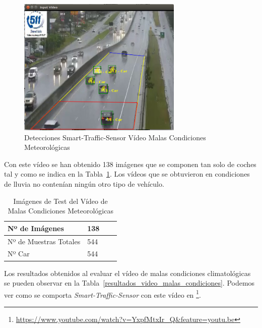 \begin{figure}[H] 
\begin{center}
	\includegraphics[width=0.7\textwidth]{figures/Experimentos/sts_malas_condiciones.png}
   \caption{Detecciones Smart-Traffic-Sensor Vídeo Malas Condiciones Meteorológicas}
	\label{fig.video_malas_condiciones}
\end{center}
\end{figure}

Con este vídeo se han obtenido 138 imágenes que se componen tan solo de coches tal y como se indica en la Tabla~\ref{tabla_video_malas_condiciones}. Los vídeos que se obtuvieron en condiciones de lluvia no contenían ningún otro tipo de vehículo.

\begin{table}[H] 
\begin{center}
\begin{tabular}{|l|l|l|l|}
\hline
Nº de Imágenes  & 138 \\
\hline \hline
Nº de Muestras Totales & 544\\ \hline
Nº Car & 544 \\ \hline
\end{tabular}
\caption{Imágenes de Test del Vídeo de Malas Condiciones Meteorológicas}
\label{tabla_video_malas_condiciones}
\end{center}
\end{table}

Los resultados obtenidos al evaluar el vídeo de malas condiciones climatológicas se pueden observar en la Tabla~\ref{resultados_video_malas_condiciones}. Podemos ver como se comporta \textit{Smart-Traffic-Sensor} con este vídeo en \footnote{\url{https://www.youtube.com/watch?v=YxpfMtxIr_Q&feature=youtu.be}}.

